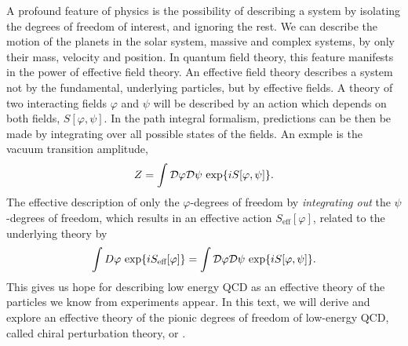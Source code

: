 A profound feature of physics is the possibility of describing a system by isolating the degrees of freedom of interest, and ignoring the rest.
We can describe the motion of the planets in the solar system, massive and complex systems, by only their mass, velocity and position.
In quantum field theory, this feature manifests in the power of effective field theory.
An effective field theory describes a system not by the fundamental, underlying particles, but by effective fields.
A theory of two interacting fields $\varphi$ and $\psi$ will be described by an action which depends on both fields, $S[\varphi, \psi]$.
In the path integral formalism, predictions can be then be made by integrating over all possible states of the fields.
An exmple is the vacuum transition amplitude,
\begin{equation}
    Z = \int \mathcal{D} \varphi \mathcal{D} \psi \, \exp{i S[\varphi, \psi]}.
\end{equation}
The effective description of only the $\varphi$-degrees of freedom by \emph{integrating out} the $\psi$-degrees of freedom, which results in an effective action $S_\text{eff}[\varphi]$, related to the underlying theory by~\cite{Schwartz:QFT}
\begin{equation}
    \label{integrating out degrees of freedom}
    \int D \varphi \, \exp{i S_\text{eff}[\varphi]} 
    =
    \int \mathcal{D} \varphi \mathcal{D} \psi \, \exp{i S[\varphi, \psi]}.
\end{equation}
This gives us hope for describing low energy QCD as an effective theory of the particles we know from experiments appear.
In this text, we will derive and explore an effective theory of the pionic degrees of freedom of low-energy QCD, called chiral perturbation theory, or \chpt.

